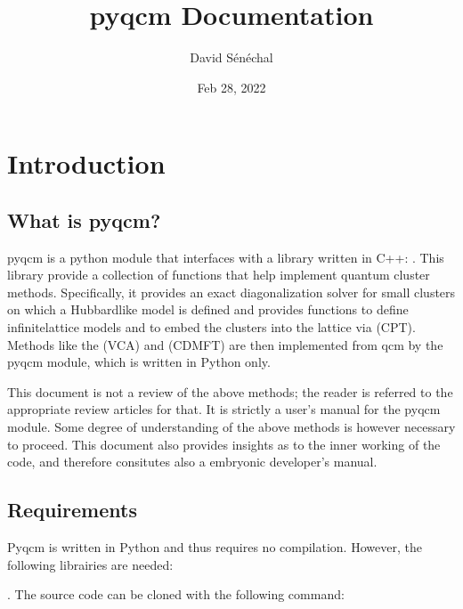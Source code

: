 \documentclass[letterpaper,10pt,english]{sphinxmanual}
\title{pyqcm Documentation}
\date{Feb 28, 2022}
\author{David Sénéchal}
\begin{document}
\pagestyle{empty}
\sphinxmaketitle
\pagestyle{plain}
\sphinxtableofcontents
\pagestyle{normal}
\label{\detokenize{index::doc}}



\chapter{Introduction}
\label{\detokenize{intro:introduction}}\label{\detokenize{intro::doc}}

\section{What is pyqcm?}
\label{\detokenize{intro:what-is-pyqcm}}
\sphinxAtStartPar
pyqcm is a python module that interfaces with a library written in C++: .
This library provide a collection of functions that help implement quantum cluster methods.
Specifically, it provides an exact diagonalization solver for small clusters on which a Hubbard\sphinxhyphen{}like model is defined and provides functions to define infinite\sphinxhyphen{}lattice models and to embed the clusters into the lattice via  (CPT). Methods like the  (VCA) and  (CDMFT) are then implemented from qcm by the pyqcm module, which is written in Python only.

\sphinxAtStartPar
This document is not a review of the above methods; the reader is referred to the appropriate review articles for that. It is strictly a user’s manual for the pyqcm module.
Some degree of understanding of the above methods is however necessary to proceed.
This document also provides insights as to the inner working of the code, and therefore consitutes also a embryonic developer’s manual.


\section{Requirements}
\label{\detokenize{intro:requirements}}
\sphinxAtStartPar
Pyqcm is written in Python and thus requires no compilation.
However, the following librairies are needed:

\sphinxAtStartPar
{}. The source code can be cloned with the following command:

\begin{sphinxVerbatim}[commandchars=\\\{\}]
  
\end{sphinxVerbatim}
\end{document}
